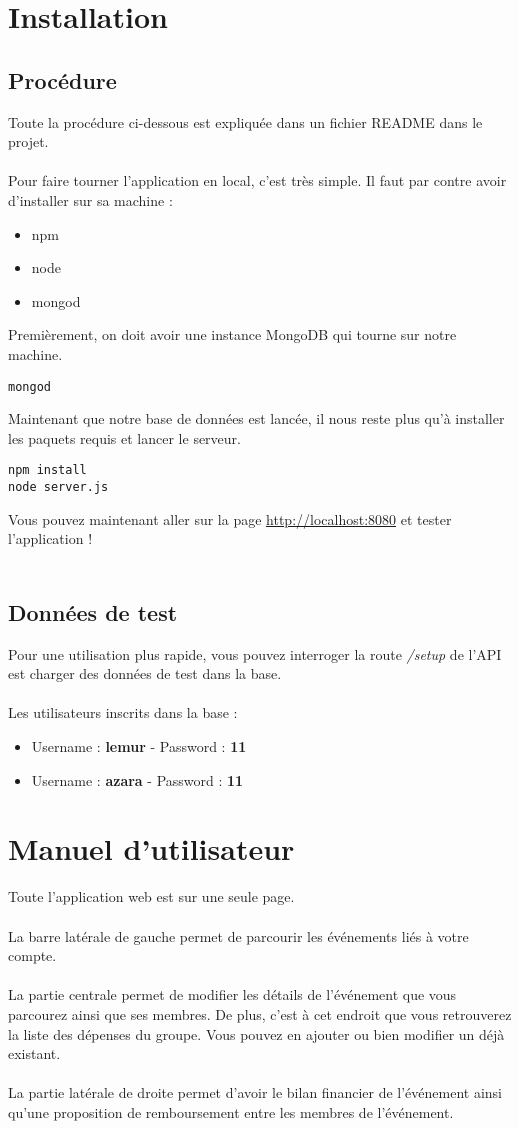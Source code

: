\documentclass[a4paper]{report}
\begin{document}
\chapter{Installation}
\section{Procédure}
Toute la procédure ci-dessous est expliquée dans un fichier README dans le projet.\\\\
Pour faire tourner l'application en local, c'est très simple. Il faut par contre avoir d'installer sur sa machine :
\begin{itemize}
\item npm
\item node
\item mongod
\end{itemize}
Premièrement, on doit avoir une instance MongoDB qui tourne sur notre machine.
\begin{verbatim}
mongod
\end{verbatim}
Maintenant que notre base de données est lancée, il nous reste plus qu'à installer les paquets requis et lancer le serveur.
\begin{verbatim}
npm install
node server.js
\end{verbatim}
Vous pouvez maintenant aller sur la page \url{http://localhost:8080} et tester l'application !\\\\
\section{Données de test}
Pour une utilisation plus rapide, vous pouvez interroger la route \textit{/setup} de l'API est charger des données de test dans la base.\\\\
Les utilisateurs inscrits dans la base :
\begin{itemize}
\item Username : \textbf{lemur} - Password : \textbf{11}
\item Username : \textbf{azara} - Password : \textbf{11}
\end{itemize}

\chapter{Manuel d'utilisateur}
Toute l'application web est sur une seule page.\\\\
La barre latérale de gauche permet de parcourir les événements liés à votre compte.\\\\
La partie centrale permet de modifier les détails de l'événement que vous parcourez ainsi que ses membres.
De plus, c'est à cet endroit que vous retrouverez la liste des dépenses du groupe. Vous pouvez en ajouter ou bien modifier un déjà existant.\\\\
La partie latérale de droite permet d'avoir le bilan financier de l'événement ainsi qu'une proposition de remboursement entre les membres de l'événement.
\end{document}
